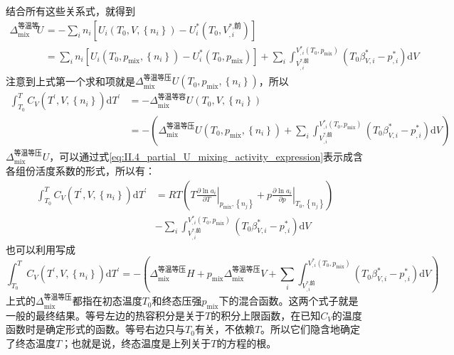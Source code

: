 \documentclass[main.tex]{subfiles}
\begin{document}
结合所有这些关系式，就得到
\begin{align*}
  \Delta_\text{mix}^\text{等温等容}U & =-\sum_in_i\left[U_i\left(T_0,V,\left\{n_i\right\}\right)-U_i^*\left(T_0,V_{,i}^\text{*,前}\right)\right]                                                                                                                               \\
                                 & =\sum_i n_i\left[U_i\left(T_0,p_\text{mix},\left\{n_i\right\}\right)-U_i^*\left(T_0,p_\text{mix}\right)\right]+\sum_i\int_{V_{,i}^\text{*,前}}^{V_{,i}^*\left(T_0,p_\text{mix}\right)}\left(T_0\beta_{V,i}^*-p_{,i}^*\right)\mathrm{d}V
\end{align*}
注意到上式第一个求和项就是$\Delta_\text{mix}^\text{等温等压}U\left(T_0,p_\text{mix},\left\{n_i\right\}\right)$，所以
\begin{align*}
  \int_{T_0}^TC_V\left(T^\prime,V,\left\{n_i\right\}\right)\mathrm{d}T^\prime & =-\Delta_\text{mix}^\text{等温等容}U\left(T_0,V,\left\{n_i\right\}\right)                                                                                                                                                 \\
                                                                              & =-\left(\Delta_\text{mix}^\text{等温等压}U\left(T_0,p_\text{mix},\left\{n_i\right\}\right)+\sum_i\int_{V_{,i}^\text{*,前}}^{V_{,i}^*\left(T_0,p_\text{mix}\right)}\left(T_0\beta_{V,i}^*-p_{,i}^*\right)\mathrm{d}V\right)
\end{align*}
$\Delta_\text{mix}^\text{等温等压}U$，可以通过式\eqref{eq:II.4_partial_U_mixing_activity_expression}表示成含各组份活度系数的形式，所以有：
\begin{align*}
  \int_{T_0}^TC_V\left(T^\prime,V,\left\{n_i\right\}\right)\mathrm{d}T^\prime & =RT\left(T\left.\frac{\partial\ln a_i}{\partial T}\right|_{p_\text{mix},\left\{n_j\right\}}+p\left.\frac{\partial\ln a_i}{\partial p}\right|_{T_0,\left\{n_j\right\}}\right) \\
                                                                              & -\sum_i\int_{V_{,i}^\text{*,前}}^{V_{,i}^*\left(T_0,p_\text{mix}\right)}\left(T_0\beta_{V,i}^*-p_{,i}^*\right)\mathrm{d}V
\end{align*}
也可以利用写成
\[\int_{T_0}^TC_V\left(T^\prime,V,\left\{n_i\right\}\right)\mathrm{d}T^\prime=-\left(\Delta_\text{mix}^\text{等温等压}H+p_\text{mix}\Delta_\text{mix}^\text{等温等压}V+\sum_i\int_{V_{,i}^\text{*,前}}^{V_{,i}^*\left(T_0,p_\text{mix}\right)}\left(T_0\beta_{V,i}^*-p_{,i}^*\right)\mathrm{d}V\right)\]
上式的$\Delta_\text{mix}^\text{等温等压}$都指在初态温度$T_0$和终态压强$p_\text{mix}$下的混合函数。这两个式子就是一般的最终结果。等号左边的热容积分是关于$T$的积分上限函数，在已知$C_V$的温度函数时是确定形式的函数。等号右边只与$T_0$有关，不依赖$T$。所以它们隐含地确定了终态温度$T$；也就是说，终态温度是上列关于$T$的方程的根。
\end{document}
